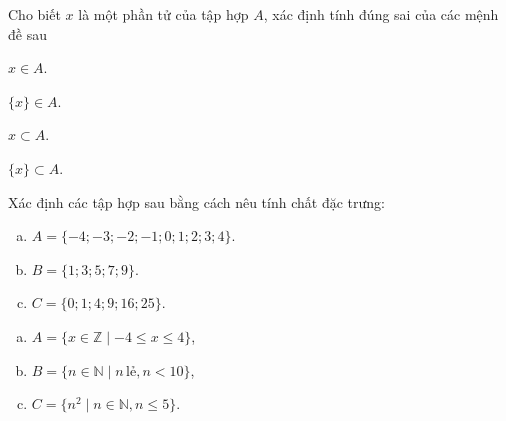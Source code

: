 \begin{bt}%
	Cho biết $x$ là một phần tử của tập hợp $A$, xác định tính đúng sai của các mệnh đề sau
	\begin{listEX}[4]
		\item $x\in A$.
		\item $\{x\}\in A$.
		\item $x\subset A$.
		\item $\{x\}\subset A$.
	\end{listEX}
\end{bt}

\begin{bt}%
	Xác định các tập hợp sau bằng cách nêu tính chất đặc trưng:
	\begin{enumerate}[a)]
		\item $A=\{-4;-3;-2;-1;0;1;2;3;4\}$.
		\item $B=\{1;3;5;7;9\}$.
		\item $C=\{0;1;4;9;16;25\}$.
	\end{enumerate}
	\loigiai
	{ \begin{enumerate}[a)]
			\item $A=\{x \in \mathbb{Z} \mid -4 \leq x\leq 4\}$,
			\item $B=\{n \in \mathbb{N} \mid n \, \text{lẻ}, n<10\}$,
			\item $C=\{n^{2} \mid n \in \mathbb{N},  n \le 5\}$.
		\end{enumerate}
	}
\end{bt}

